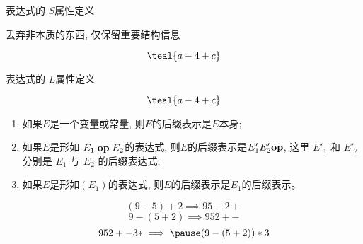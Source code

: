 \begin{frame}{}
  \begin{center}
    表达式的 $S$属性定义

  \end{center}
\end{frame}

\begin{frame}{}
  \begin{center}
     丢弃非本质的东西, 仅保留重要结构信息

    \vspace{-0.50cm}
    \[
      \teal{a - 4 + c}
    \]
  \end{center}
\end{frame}

\begin{frame}{}
  \begin{center}
    表达式的 $L$属性定义

  \end{center}
\end{frame}

\begin{frame}{}
  \begin{center}
    \[
      \teal{a - 4 + c}
    \]
  \end{center}
\end{frame}

\begin{frame}{}
  \begin{definition}
    \begin{enumerate}[(1)]
      \setlength{\itemsep}{8pt}
      \item 如果$E$是一个变量或常量, 则$E$的后缀表示是$E$本身;
      \item 如果$E$是形如 $E_{1} \;\text{\bf op}\; E_{2}$的表达式,
        则$E$的后缀表示是$E'_{1} E'_{2} \text{\bf op}$,
        这里 $E'_{1}$ 和 $E'_{2}$ 分别是 $E_{1}$ 与 $E_{2}$ 的后缀表达式;
      \item 如果$E$是形如$(E_{1})$的表达式, 则$E$的后缀表示是$E_{1}$的后缀表示。
    \end{enumerate}
  \end{definition}

  \pause
  \begin{center}
    \[
      (9-5)+2 \implies 95-2+
    \]
    \[
      9-(5+2) \implies 952+-
    \]
    \pause
    \[
      952+-3\ast \implies\pause (9-(5+2)) \ast 3
    \]
  \end{center}
\end{frame}

